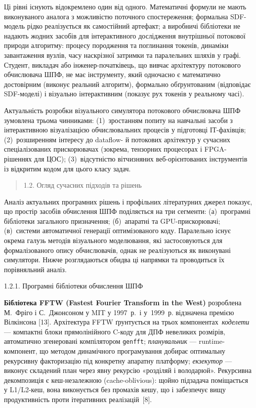 Ці рівні існують відокремлено один від одного. Математичні формули не
мають виконуваного аналога з можливістю поточного спостереження;
формальна SDF-модель рідко реалізується як самостійний артефакт; а
виробничі бібліотеки не надають жодних засобів для інтерактивного
дослідження внутрішньої потокової природи алгоритму: процесу породження
та поглинання токенів, динаміки завантаження вузлів, часу наскрізної
затримки та паралельних шляхів у графі. Студент, викладач або
інженер-початківець, що вивчає архітектуру потокового обчислювача ШПФ,
не має інструменту, який одночасно є математично достовірним (виконує
реальний алгоритм), формально обґрунтованим (відповідає SDF-моделі) і
візуально інтерактивним (показує рух токенів у реальному часі).

Актуальність розробки візуального симулятора потокового обчислювача ШПФ
зумовлена трьома чинниками: (1)~зростанням попиту на навчальні засоби з
інтерактивною візуалізацією обчислювальних процесів у підготовці
ІТ-фахівців; (2)~розширенням інтересу до dataflow- й потокових
архітектур у сучасних спеціалізованих прискорювачах (зокрема, тензорних
процесорах і FPGA-рішеннях для ЦОС); (3)~відсутністю вітчизняних
веб-орієнтованих інструментів із відкритим кодом для цього класу задач.

\begin{quote}
\protect{}\label{_Toc229682906}{}1.2. Огляд сучасних
підходів та рішень
\end{quote}

Аналіз актуальних програмних рішень і профільних літературних джерел
показує, що простір засобів обчислення ШПФ поділяється на три сегменти:
(а)~програмні бібліотеки загального призначення; (б)~апаратні та
GPU-прискорювачі; (в)~системи автоматичної генерації оптимізованого
коду. Паралельно існує окрема галузь методів візуального моделювання,
які застосовуються для формалізованого опису обчислювачів, однак не
реалізуються як виконувані симулятори. Нижче розглядаються обидва ці
напрямки та проводиться їх порівняльний аналіз.

1.2.1. Програмні бібліотеки обчислення ШПФ

\textbf{Бібліотека FFTW (Fastest Fourier Transform in the West)}
розроблена М.~Фріго і С.~Джонсоном у MIT у 1997~р.~і у~1999~р.
відзначена премією Вілкінсона {[}13{]}. Архітектура FFTW ґрунтується на
трьох компонентах~\emph{коделети} --- компактні блоки прямолінійного
C-коду для ДПФ невеликих розмірів, автоматично згенеровані компілятором
\texttt{genfft}; \emph{планувальник} --- runtime-компонент, що методом
динамічного програмування добирає оптимальну рекурсивну факторизацію під
конкретну апаратну платформу; \emph{екзекутор} --- виконує складений
план через явну рекурсію «розділяй і володарюй». Рекурсивна декомпозиція
є кеш-незалежною (cache-oblivious): щойно підзадача поміщається у
L1/L2-кеш, вона виконується без промахів кешу, що і забезпечує вищу
продуктивність проти ітеративних реалізацій~{[}8{]}.

